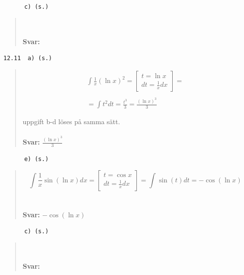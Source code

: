 \documentclass[a4paper]{article}
\newcommand{\tskcol}[1]{\textcolor{tskcol}{#1}}
\begin{document}
	\texttt{\tskcol{~~~~~~c) (s.)}}
	\begin{quotation}
		\noindent
		\\ \\
		\textbf{Svar:}
	\end{quotation}
	\texttt{\tskcol{12.11~~a) (s.)}}
	\begin{quotation}
		\noindent
		\begin{equation}
			\begin{array}{l}
			\int \frac{1}{x}(\ln x)^{2}=\left[\begin{array}{l}
			t=\ln x \\
			d t=\frac{1}{x}dx
			\end{array}\right]= \\\\
			=\int t^{2} d t=\frac{t^{3}}{3}=\frac{(\ln x)^{3}}{3}
			\end{array}
			\end{equation}

			uppgift b-d löses på samma sätt.
		\\ \\
		\textbf{Svar:} $\frac{(\ln x)^{3}}{3}$
	\end{quotation}
	\texttt{\tskcol{~~~~~~e) (s.)}}
	\begin{quotation}
		\noindent
		\begin{equation}
			\int \frac{1}{x} \sin (\ln x) d x=\left[\begin{array}{l}
			t=\cos x \\
			d t=\frac{1}{x} d x
			\end{array}\right]=\int \sin(t) d t=-\cos (\ln x)
			\end{equation}
		\\ \\
		\textbf{Svar:} $-\cos (\ln x)$
	\end{quotation}
	
	\texttt{\tskcol{~~~~~~c) (s.)}}
	\begin{quotation}
		\noindent
		\\ \\
		\textbf{Svar:}
	\end{quotation}
\end{document}

